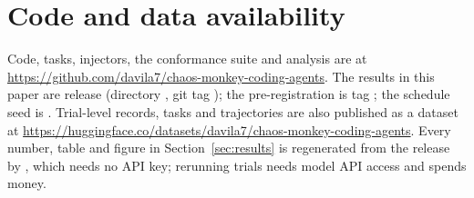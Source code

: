 \section*{Code and data availability}
\label{sec:availability}

Code, tasks, injectors, the conformance suite and analysis are at \url{https://github.com/davila7/chaos-monkey-coding-agents}.
The results in this paper are release  (directory , git tag ); the pre-registration is tag ; the schedule seed is .
Trial-level records, tasks and trajectories are also published as a dataset at \url{https://huggingface.co/datasets/davila7/chaos-monkey-coding-agents}.
Every number, table and figure in Section~\ref{sec:results} is regenerated from the release by , which needs no API key; rerunning trials needs model API access and spends money.
